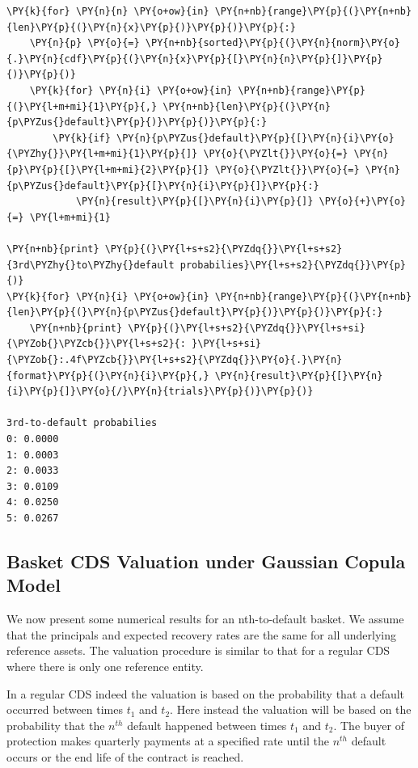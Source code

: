 \begin{tcolorbox}[breakable, size=fbox, boxrule=1pt, pad at break*=1mm,colback=cellbackground, colframe=cellborder]
\begin{Verbatim}[commandchars=\\\{\}]
\PY{k}{for} \PY{n}{n} \PY{o+ow}{in} \PY{n+nb}{range}\PY{p}{(}\PY{n+nb}{len}\PY{p}{(}\PY{n}{x}\PY{p}{)}\PY{p}{)}\PY{p}{:}
    \PY{n}{p} \PY{o}{=} \PY{n+nb}{sorted}\PY{p}{(}\PY{n}{norm}\PY{o}{.}\PY{n}{cdf}\PY{p}{(}\PY{n}{x}\PY{p}{[}\PY{n}{n}\PY{p}{]}\PY{p}{)}\PY{p}{)}
    \PY{k}{for} \PY{n}{i} \PY{o+ow}{in} \PY{n+nb}{range}\PY{p}{(}\PY{l+m+mi}{1}\PY{p}{,} \PY{n+nb}{len}\PY{p}{(}\PY{n}{p\PYZus{}default}\PY{p}{)}\PY{p}{)}\PY{p}{:}
        \PY{k}{if} \PY{n}{p\PYZus{}default}\PY{p}{[}\PY{n}{i}\PY{o}{\PYZhy{}}\PY{l+m+mi}{1}\PY{p}{]} \PY{o}{\PYZlt{}}\PY{o}{=} \PY{n}{p}\PY{p}{[}\PY{l+m+mi}{2}\PY{p}{]} \PY{o}{\PYZlt{}}\PY{o}{=} \PY{n}{p\PYZus{}default}\PY{p}{[}\PY{n}{i}\PY{p}{]}\PY{p}{:}
            \PY{n}{result}\PY{p}{[}\PY{n}{i}\PY{p}{]} \PY{o}{+}\PY{o}{=} \PY{l+m+mi}{1}
	
\PY{n+nb}{print} \PY{p}{(}\PY{l+s+s2}{\PYZdq{}}\PY{l+s+s2}{3rd\PYZhy{}to\PYZhy{}default probabilies}\PY{l+s+s2}{\PYZdq{}}\PY{p}{)}
\PY{k}{for} \PY{n}{i} \PY{o+ow}{in} \PY{n+nb}{range}\PY{p}{(}\PY{n+nb}{len}\PY{p}{(}\PY{n}{p\PYZus{}default}\PY{p}{)}\PY{p}{)}\PY{p}{:}
    \PY{n+nb}{print} \PY{p}{(}\PY{l+s+s2}{\PYZdq{}}\PY{l+s+si}{\PYZob{}\PYZcb{}}\PY{l+s+s2}{: }\PY{l+s+si}{\PYZob{}:.4f\PYZcb{}}\PY{l+s+s2}{\PYZdq{}}\PY{o}{.}\PY{n}{format}\PY{p}{(}\PY{n}{i}\PY{p}{,} \PY{n}{result}\PY{p}{[}\PY{n}{i}\PY{p}{]}\PY{o}{/}\PY{n}{trials}\PY{p}{)}\PY{p}{)}

3rd-to-default probabilies
0: 0.0000
1: 0.0003
2: 0.0033
3: 0.0109
4: 0.0250
5: 0.0267
\end{Verbatim}
\end{tcolorbox}

\subsection{Basket CDS Valuation under Gaussian Copula Model}\label{basket-cds-valuation-under-market-standard-model}
We now present some numerical results for an nth-to-default basket.
We assume that the principals and expected recovery rates are the same
for all underlying reference assets. The valuation procedure is similar
to that for a regular CDS where there is only one reference entity.

In a regular CDS indeed the valuation is based on the probability that a
default occurred between times \(t_1\) and \(t_2\). Here instead the
valuation will be based on the probability that the $n^{th}$ default happened
between times \(t_1\) and \(t_2\).
The buyer of protection makes quarterly payments at a
specified rate until the $n^{th}$ default occurs or the end life
of the contract is reached.

